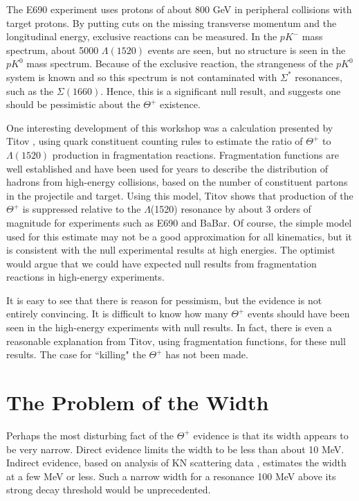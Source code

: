 \documentclass{ws-procs9x6}
\newcommand{\thp}{$\Theta^+$ }
\begin{document}
The E690 experiment \cite{e690} uses protons of about 800 GeV in 
peripheral collisions with target protons.  By putting cuts on 
the missing transverse momentum and the longitudinal energy, 
exclusive reactions can be measured.  In the $pK^-$ mass spectrum, 
about 5000 $\Lambda (1520)$ events are seen, but no structure 
is seen in the $pK^0$ mass spectrum.  Because of the exclusive 
reaction, the strangeness of the $pK^0$ system is known and so 
this spectrum is not contaminated with $\Sigma^*$ resonances, 
such as the $\Sigma (1660)$.  Hence, this is a significant null 
result, and suggests one should be pessimistic about the \thp existence. 

One interesting development of this workshop was a calculation 
presented by Titov \cite{titov}, using quark constituent counting 
rules to estimate the ratio of \thp to $\Lambda (1520)$ production 
in fragmentation reactions.  Fragmentation functions are well 
established \cite{close} and have been used for years to describe 
the distribution of hadrons from high-energy collisions, based 
on the number of constituent partons in the projectile and target. 
Using this model, Titov shows that production of the $\Theta^+$ 
is suppressed relative to the $\Lambda$(1520) resonance by about 
3 orders of magnitude for experiments such as E690 and BaBar. 
Of course, the simple model used for this estimate may not be 
a good approximation for all kinematics, but it is consistent 
with the null experimental results at high energies.
The optimist would argue that we could have expected null 
results from fragmentation reactions in high-energy experiments.

It is easy to see that there is reason for pessimism, but the 
evidence is not entirely convincing. It is difficult to 
know how many \thp events should have been seen in the 
high-energy experiments with null results.  In fact, there is 
even a reasonable explanation from Titov, using fragmentation 
functions, for these null results.  The case for ``killing" 
the \thp has not been made.

\section{ The Problem of the Width }

Perhaps the most disturbing fact of the \thp evidence is 
that its width appears to be very narrow. Direct evidence 
\cite{diana,hermes,zeus} limits the width to be less 
than about 10 MeV.  Indirect evidence, based on analysis 
of KN scattering data \cite{nussinov,cahn,arndt,jeulich,gibbs}, 
estimates the width at a few MeV or less.  Such a narrow 
width for a resonance 100 MeV above its strong decay threshold 
would be unprecedented. 
\end{document}
